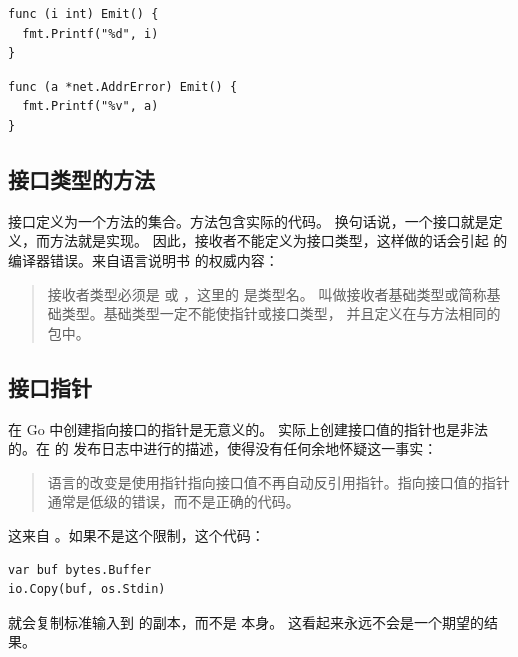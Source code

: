 \begin{minipage}{.5\textwidth}
\begin{lstlisting}[linewidth=.7\textwidth,caption=扩展内建类型错误]
func (i int) Emit() {
  fmt.Printf("%d", i)
}
\end{lstlisting}
\noindent{}
\end{minipage}
\begin{minipage}{.5\textwidth}
\begin{lstlisting}[caption=扩展非本地类型错误]
func (a *net.AddrError) Emit() {
  fmt.Printf("%v", a)
}
\end{lstlisting}
\noindent{}
\end{minipage}

\paragraph{}  %

\subsection{接口类型的方法}
接口定义为一个方法的集合。方法包含实际的代码。
换句话说，一个接口就是定义，而方法就是实现。
因此，接收者不能定义为接口类型，这样做的话会引起
 的编译器错误。来自语言说明书 \cite{go_spec} 的权威内容：
\begin{quote}
接收者类型必须是  或 ，这里的  是类型名。
 叫做接收者基础类型或简称基础类型。基础类型一定不能使指针或接口类型，
并且定义在与方法相同的包中。
\end{quote}

\subsection{接口指针}
\begin{lbar}
在 Go 中创建指向接口的指针是无意义的。
实际上创建接口值的指针也是非法的。在  的
发布日志中进行的描述，使得没有任何余地怀疑这一事实：
\begin{quote}
语言的改变是使用指针指向接口值不再自动反引用指针。指向接口值的指针通常是低级的错误，而不是正确的代码。
\end{quote}
这来自 \cite{go_faq}。如果不是这个限制，这个代码：
\begin{lstlisting}
var buf bytes.Buffer
io.Copy(buf, os.Stdin)
\end{lstlisting}
就会复制标准输入到  的副本，而不是  本身。
这看起来永远不会是一个期望的结果。
\end{lbar}

